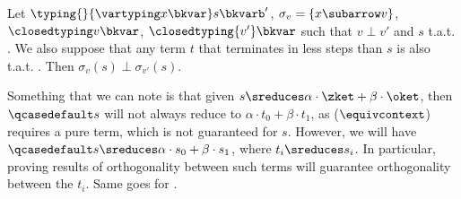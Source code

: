 \begin{lemma}\label{lem:subred-can-ortho}
  Let $\typing {} {\vartyping x \bkvar} s \bkvarb'$, $\sigma_v = \{x
  \subarrow v\}$,
  $\closedtyping v \bkvar$, $\closedtyping {v'} \bkvar$ such that $v
  \perp v'$ and $s$ t.a.t. .
  We also suppose that any term $t$ that terminates in less
  steps than $s$ is also t.a.t. .
  Then $\sigma_v(s) \perp \sigma_{v'}(s)$.
\end{lemma}

Something that we can note is that given $s \sreduces \alpha \cdot
\zket + \beta \cdot \oket$,
then $\qcasedefault s$ will not always reduce to $\alpha \cdot t_0 +
\beta \cdot t_1$,
as ($\equivcontext$) requires a pure term, which is not guaranteed for $s$.
However, we will have $\qcasedefault s \sreduces \alpha \cdot s_0 +
\beta \cdot s_1$,
where $t_i \sreduces s_i$. In particular, proving results of orthogonality
between such terms will guarantee orthogonality between the $t_i$.
Same goes for \textmatch{}.

